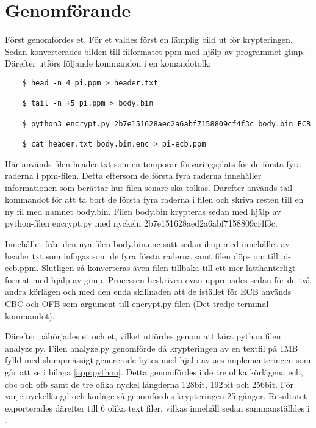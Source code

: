 \section{Genomförande} %
Först genomfördes et. För et valdes först en lämplig bild ut för krypteringen. Sedan
konverterades bilden till filformatet \gls{ppm} med hjälp av programmet \gls{gimp}. Därefter utförs följande kommandon i en komandotolk:

\begin{verbatim}
    $ head -n 4 pi.ppm > header.txt

    $ tail -n +5 pi.ppm > body.bin

    $ python3 encrypt.py 2b7e151628aed2a6abf7158809cf4f3c body.bin ECB

    $ cat header.txt body.bin.enc > pi-ecb.ppm
\end{verbatim}

Här används filen header.txt som en temporär förvaringsplats för de första fyra raderna i \gls{ppm}-filen. Detta
eftersom de första fyra raderna innehåller informationen som berättar hur filen senare ska tolkas. Därefter används
tail-kommandot för att ta bort de första fyra raderna i filen och skriva resten till en ny fil med namnet body.bin.
Filen body.bin krypteras sedan med hjälp av \gls{python}-filen encrypt.py med nyckeln 2b7e151628aed2a6abf7158809cf4f3c.

Innehållet från den nya filen body.bin.enc sätt sedan ihop med innehållet av header.txt som infogas som de fyra första raderna samt filen döps om till pi-ecb.ppm.
Slutligen så konverteras även filen tillbaka till ett mer lätthanterligt format med hjälp av \gls{gimp}.
Processen beskriven ovan upprepades sedan för de två andra körlägen  och  med
den enda skillnaden att de istället för ECB används CBC och OFB som argument till encrypt.py filen (Det tredje terminal kommandot).

Därefter påbörjades et och et, vilket utfördes genom att köra
\gls{python} filen analyze.py. Filen analyze.py genomförde då krypteringen av en textfil på 1MB fylld med slumpmässigt genererade \gls{byte}s med hjälp av \acrshort{aes}-implementeringen
som går att se i bilaga \ref{app:python}. Detta genomfördes i de tre olika körlägena \acrshort{ecb}, \acrshort{cbc} och \acrshort{ofb} samt de tre olika nyckel längderna 128bit, 192bit och 256bit.
För varje nyckellängd och körläge så genomfördes krypteringen 25 gånger. Resultatet exporterades därefter till 6 olika text filer, vilkas innehåll sedan sammanställdes i .
